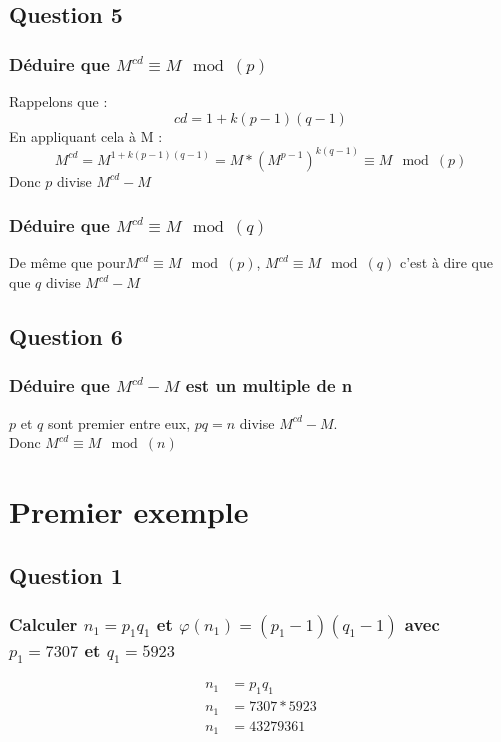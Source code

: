\documentclass[a4paper,10pt]{article}
\begin{document}
\subsection{Question 5}
\subsubsection{Déduire que $M^{cd}\equiv M \mod(p)$}
Rappelons que :
\begin{equation}
	cd = 1+k(p-1)(q-1)
\end{equation}
En appliquant cela à M :\\
\begin{equation}
 M^{cd}=M^{1+k(p-1)(q-1)}=M*(M^{p-1})^{k(q-1)}\equiv M \mod(p)
\end{equation}
Donc $p$ divise $M^{cd}-M$
\subsubsection{Déduire que $M^{cd}\equiv M \mod(q)$}
De même que pour$M^{cd}\equiv M \mod(p)$, $M^{cd}\equiv M \mod(q)$ c'est à dire que que $q$ divise $M^{cd}-M$ 
\subsection{Question 6}
\subsubsection{Déduire que $M^{cd} - M$ est un multiple de n}
$p$ et $q$ sont premier entre eux, $pq=n$ divise $M^{cd} - M$.\\
Donc $M^{cd}\equiv M \mod(n)$
\clearpage
\section{Premier exemple}
\subsection{Question 1}
\subsubsection{Calculer $n_1 = p_1 q_1$ et $\varphi(n_1) = (p_1 - 1)(q_1 - 1)$ avec $p_1 = 7307$ et $q_1 = 5923$}

\begin{align*}
n_1 &= p_1 q_1\\
n_1 &= 7307 * 5923\\
n_1 &= 43279361
\end{align*}
\end{document}
